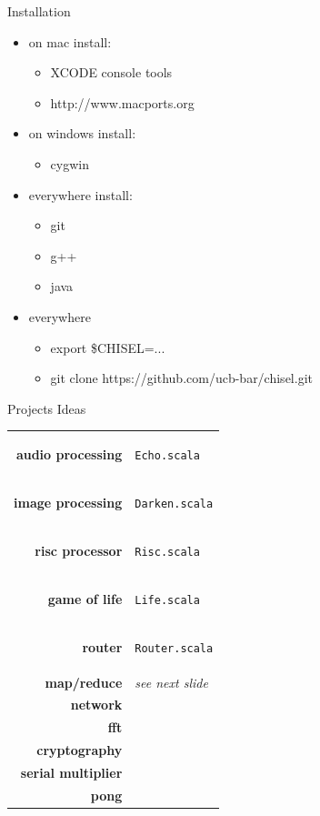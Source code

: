\documentclass[xcolor=pdflatex,dvipsnames,table]{beamer}
\newcommand{\code}[1]{\begin{footnotesize}{\tt #1}\end{footnotesize}}
\begin{document}
\begin{frame}[fragile]{Installation}
\begin{itemize}
\item on mac install:
\begin{itemize}
\item XCODE console tools
\item http://www.macports.org
\end{itemize}
\item on windows install:
\begin{itemize}
\item cygwin
\end{itemize}
\item everywhere install:
\begin{itemize}
\item git
\item g++
\item java
\end{itemize}
\item everywhere
\begin{itemize}
\item export \$CHISEL=...
\item git clone https://github.com/ucb-bar/chisel.git
\end{itemize}
\end{itemize}

\end{frame}

\begin{frame}[fragile]{Projects Ideas}

\begin{center}
\begin{tabular}{rl}
\textbf{audio processing} & \code{Echo.scala} \\
\textbf{image processing} & \code{Darken.scala} \\
\textbf{risc processor} & \code{Risc.scala} \\
\textbf{game of life} & \code{Life.scala} \\
\textbf{router} & \code{Router.scala} \\
\textbf{map/reduce} & \textit{see next slide}\\
\textbf{network} & \\
\textbf{fft} & \\
\textbf{cryptography} & \\
\textbf{serial multiplier} & \\
\textbf{pong} & \\
\end{tabular}
\end{center}

\end{frame}
\end{document}
